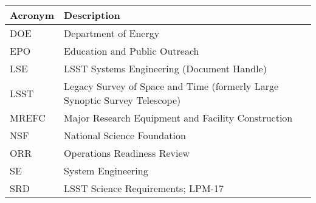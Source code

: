 \addtocounter{table}{-1}
\begin{longtable}{p{}p{}}\hline
\textbf{Acronym} & \textbf{Description}  \\\hline

DOE & Department of Energy \\\hline
EPO & Education and Public Outreach \\\hline
LSE & LSST Systems Engineering (Document Handle) \\\hline
LSST & Legacy Survey of Space and Time (formerly Large Synoptic Survey Telescope) \\\hline
MREFC & Major Research Equipment and Facility Construction \\\hline
NSF & National Science Foundation \\\hline
ORR & Operations Readiness Review \\\hline
SE & System Engineering \\\hline
SRD & LSST Science Requirements; LPM-17 \\\hline
\end{longtable}
